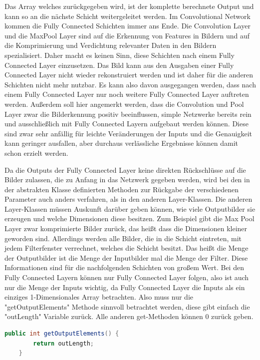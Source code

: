 \documentclass[12pt]{article}
\begin{document}
Das Array welches zurückgegeben wird, ist der komplette berechnete Output und kann so an die nächste Schicht weitergeleitet werden. Im Convolutional Network kommen die Fully Connected Schichten immer ans Ende. Die Convolution Layer und die MaxPool Layer sind auf die Erkennung von Features in Bildern und auf die Komprimierung und Verdichtung relevanter Daten in den Bildern spezialisiert. Daher macht es keinen Sinn, diese Schichten nach einem Fully Connected Layer einzusetzen. Das Bild kann aus den Ausgaben einer Fully Connected Layer nicht wieder rekonstruiert werden und ist daher für die anderen Schichten nicht mehr nutzbar. Es kann also davon ausgegangen werden, dass nach einem Fully Connected Layer nur noch weitere Fully Connected Layer auftreten werden. 
Außerdem soll hier angemerkt werden, dass die Convolution und Pool Layer zwar die Bilderkennung positiv beeinflussen, simple Netzwerke bereits rein und ausschließlich mit Fully Connected Layern aufgebaut werden können. Diese sind zwar sehr anfällig für leichte Veränderungen der Inputs und die Genauigkeit kann geringer ausfallen, aber durchaus verlässliche Ergebnisse können damit schon erzielt werden.

Da die Outputs der Fully Connected Layer keine direkten Rückschlüsse auf die Bilder zulassen, die zu Anfang in das Netzwerk gegeben werden, wird bei den in der abstrakten Klasse definierten Methoden zur Rückgabe der verschiedenen Parameter auch anders verfahren, als in den anderen Layer-Klassen. Die anderen Layer-Klassen müssen Auskunft darüber geben können, wie viele Outputbilder sie erzeugen und welche Dimensionen diese besitzen. Zum Beispiel gibt die Max Pool Layer zwar komprimierte Bilder zurück, das heißt dass die Dimensionen kleiner geworden sind. Allerdings werden alle Bilder, die in die Schicht eintreten, mit jedem Filterfenster verrechnet, welches die Schicht besitzt. Das heißt die Menge der Outputbilder ist die Menge der Inputbilder mal die Menge der Filter. Diese Informationen sind für die nachfolgenden Schichten von großem Wert. Bei den Fully Connected Layern können nur Fully Connected Layer folgen, also ist auch nur die Menge der Inputs wichtig, da Fully Connected Layer die Inputs als ein einziges 1-Dimensionales Array betrachten. Also muss nur die "getOutputElements" Methode sinnvoll betrachtet werden, diese gibt einfach die "outLength" Variable zurück. Alle anderen get-Methoden können 0 zurück geben.

\begin{lstlisting}[language=Java] 
    public int getOutputElements() {
        return outLength;
    }
\end{lstlisting} 
\clearpage
\end{document}
